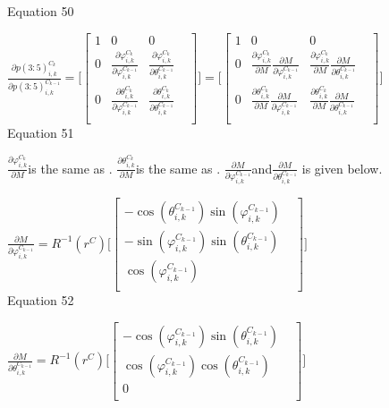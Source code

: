 Equation 50



$\frac{\partial p(3:5)_{i,k}^{C_{k}}}{\partial 
p(3:5)_{i,k}^{C_{k-1}}}=\lbrack \begin{bmatrix}
1 & 0 & 0 & \\
0 & \frac{\partial \varphi _{i, k}^{C_{k}}}{\partial \varphi _{i, 
k}^{C_{k-1}}} & \frac{\partial \varphi _{i, k}^{C_{k}}}{\partial \theta 
_{i, k}^{C_{k-1}}} & \\
0 & \frac{\partial \theta _{i, k}^{C_{k}}}{\partial \varphi _{i, 
k}^{C_{k-1}}} & \frac{\partial \theta _{i, k}^{C_{k}}}{\partial \theta 
_{i, k}^{C_{k-1}}} & \\
\end{bmatrix}
\rbrack =\lbrack \begin{bmatrix}
1 & 0 & 0 & \\
0 & \frac{\partial \varphi _{i, k}^{C_{k}}}{\partial M}\frac{\partial 
M}{\partial \varphi _{i, k}^{C_{k-1}}} & \frac{\partial \varphi _{i, 
k}^{C_{k}}}{\partial M}\frac{\partial M}{\partial \theta _{i, 
k}^{C_{k-1}}} & \\
0 & \frac{\partial \theta _{i, k}^{C_{k}}}{\partial M}\frac{\partial 
M}{\partial \varphi _{i, k}^{C_{k-1}}} & \frac{\partial \theta _{i, 
k}^{C_{k}}}{\partial M}\frac{\partial M}{\partial \theta _{i, 
k}^{C_{k-1}}} & \\
\end{bmatrix}
\rbrack $\\


Equation 51

$\frac{\partial \varphi _{i, k}^{C_{k}}}{\partial M}$is the same as . 
$\frac{\partial \theta _{i, k}^{C_{k}}}{\partial M}$is the same as . 
$\frac{\partial M}{\partial \varphi _{i,k}^{C_{k-1}}}$and$
\frac{\partial M}{\partial \theta _{i, k}^{C_{k-1}}}$ is given below.

$\frac{\partial M}{\partial \varphi 
_{i,k}^{C_{k-1}}}=R^{-1}(r^{C})\lbrack \begin{bmatrix}
-\cos (\theta _{i, k}^{C_{k-1}})\sin (\varphi _{i,k}^{C_{k-1}}) & \\
-\sin (\varphi _{i,k}^{C_{k-1}})\sin (\theta _{i, k}^{C_{k-1}}) & \\
\cos (\varphi _{i,k}^{C_{k-1}}) & \\
\end{bmatrix}
\rbrack $\\


Equation 52

$\frac{\partial M}{\partial \theta _{i, 
k}^{C_{k-1}}}=R^{-1}(r^{C})\lbrack \begin{bmatrix}
-\cos (\varphi _{i,k}^{C_{k-1}})\sin (\theta _{i, k}^{C_{k-1}}) & \\
\cos (\varphi _{i,k}^{C_{k-1}})\cos (\theta _{i, k}^{C_{k-1}}) & \\
0 & \\
\end{bmatrix}
\rbrack $\\


